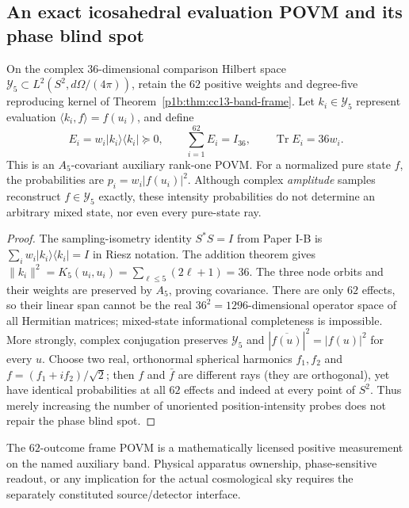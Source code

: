 \documentclass[12pt,a4paper]{article}
\begin{document}
\subsection{An exact icosahedral evaluation POVM and its phase blind spot}
\label{p4a:sec:cc13-angular-povm}

\begin{proposition}
\label{p4a:prop:cc13-angular-povm}
On the complex $36$-dimensional comparison Hilbert space
$\mathscr Y_5\subset L^2(S^2,d\Omega/(4\pi))$, retain the
$62$ positive weights and degree-five reproducing kernel of
Theorem~\ref{p1b:thm:cc13-band-frame}.  Let $k_i\in\mathscr Y_5$
represent evaluation $\langle k_i,f\rangle=f(u_i)$, and define
\[
 \boxed{E_i=w_i|k_i\rangle\langle k_i|\succeq0,
 \qquad\sum_{i=1}^{62}E_i=I_{36},\qquad
 \operatorname{Tr}E_i=36w_i.}
\]
This is an $A_5$-covariant auxiliary rank-one POVM.  For a normalized
pure state $f$, the probabilities are
$p_i=w_i|f(u_i)|^2$.  Although complex \emph{amplitude} samples
reconstruct $f\in\mathscr Y_5$ exactly, these intensity probabilities
do not determine an arbitrary mixed state, nor even every pure-state ray.
\end{proposition}
\begin{proof}
The sampling-isometry identity $S^*S=I$ from Paper I-B is
$\sum_iw_i|k_i\rangle\langle k_i|=I$ in Riesz notation.
The addition theorem gives
$\|k_i\|^2=K_5(u_i,u_i)=\sum_{\ell\le5}(2\ell+1)=36$.
The three node orbits and their weights are preserved by $A_5$,
proving covariance.  There are only $62$ effects, so their linear span
cannot be the real $36^2=1296$-dimensional operator space of all
Hermitian matrices; mixed-state informational completeness is impossible.
More strongly, complex conjugation preserves $\mathscr Y_5$ and
$|\overline{f(u)}|^2=|f(u)|^2$ for every $u$.  Choose two real,
orthonormal spherical harmonics $f_1,f_2$ and
$f=(f_1+i f_2)/\sqrt2$; then $f$ and $\bar f$ are different rays
(they are orthogonal), yet have identical probabilities at all
$62$ effects and indeed at every point of $S^2$.  Thus merely
increasing the number of unoriented position-intensity probes does
not repair the phase blind spot.
\end{proof}

\begin{remark}
The $62$-outcome frame POVM is a mathematically licensed positive
measurement on the named auxiliary band.  Physical apparatus ownership,
phase-sensitive readout, or any implication for the actual cosmological
sky requires the separately constituted source/detector interface.
\end{remark}
\end{document}
